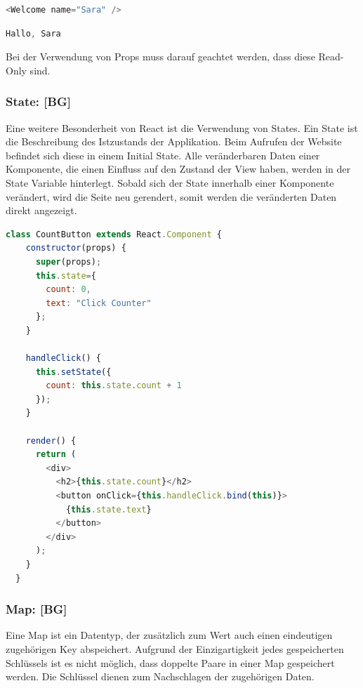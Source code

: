 \begin{lstlisting}[language=JavaScript, caption=Aufruf der Komponente 'Welcome' mit Übergabe des props 'name', label=lst:impl:UebergabeName]
  <Welcome name="Sara" />
\end{lstlisting}\cite{PropsAndComponents}

\begin{lstlisting}[language=JavaScript, caption=Ausgabe der Komponente 'Welcome', label=lst:impl:ausgabeComponentWelcome]
  Hallo, Sara
\end{lstlisting}

Bei der Verwendung von Props muss darauf geachtet werden, dass diese Read-Only sind.
\cite{PropsAndComponents2}

\subsubsection{State: [BG]}
Eine weitere Besonderheit von React ist die Verwendung von States. Ein State ist die Beschreibung des Istzustands der Applikation. Beim Aufrufen der Website befindet sich diese in einem Initial State. Alle veränderbaren Daten einer Komponente, die einen Einfluss auf den Zustand der View haben, werden in der State Variable hinterlegt.
Sobald sich der State innerhalb einer Komponente verändert, wird die Seite neu gerendert, somit werden die veränderten Daten direkt angezeigt.
\cite{T3NReact}

\begin{lstlisting}[language=JavaScript, caption=Beispiel Code eines Click Counters mit der Nutzung on States, label=lst:impl:CountButton]
  class CountButton extends React.Component {
    constructor(props) {
      super(props);
      this.state={
        count: 0,
        text: "Click Counter"
      };
    }

    handleClick() {
      this.setState({
        count: this.state.count + 1
      });
    }

    render() {
      return (
        <div>
          <h2>{this.state.count}</h2>
          <button onClick={this.handleClick.bind(this)}>
            {this.state.text}
          </button>
        </div>
      );
    }
  }
\end{lstlisting} \cite{CountButtonExampleCode}

\newpage

\subsubsection{Map: [BG]}
Eine Map ist ein Datentyp, der zusätzlich zum Wert auch einen eindeutigen zugehörigen Key abspeichert. Aufgrund der Einzigartigkeit jedes gespeicherten Schlüssels ist es nicht möglich, dass doppelte Paare in einer Map gespeichert werden. Die Schlüssel dienen zum Nachschlagen der zugehörigen Daten.

